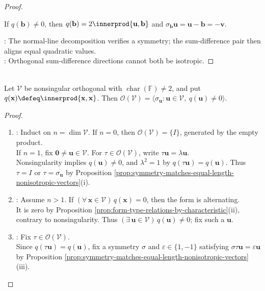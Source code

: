 \begin{proposition}
\begin{proof}
\begin{enumerate}[label=(\roman*)]
If $q(\mathbf{b})\neq0$, then $q(\mathbf{b})=2\innerprod{\mathbf{u},\mathbf{b}}$ and $\sigma_{\mathbf{b}}\mathbf{u}=\mathbf{u}-\mathbf{b}=-\mathbf{v}$.
\end{enumerate}
: The normal-line decomposition verifies a symmetry; the sum-difference pair then aligns equal quadratic values.\\
: Orthogonal sum-difference directions cannot both be isotropic.
\end{proof}
\end{proposition}

\begin{theorem} \label{thm:orthogonal-transformations-products-of-symmetries} \\
Let $\mathcal{V}$ be nonsingular orthogonal with $\operatorname{char}(\mathbb{F})\neq2$, and put $q(\mathbf{x})\defeq\innerprod{\mathbf{x},\mathbf{x}}$. Then $\mathcal{O}(\mathcal{V})=\langle\sigma_{\mathbf{u}}:\mathbf{u}\in\mathcal{V},\ q(\mathbf{u})\neq0\rangle$.
\begin{proof}
\begin{enumerate}[label=(\roman*)]
\setlength{\itemsep}{0pt}
\item {}: Induct on $n=\dim\mathcal{V}$. If $n=0$, then $\mathcal{O}(\mathcal{V})=\{I\}$, generated by the empty product.\\
If $n=1$, fix $\mathbf{0}\neq\mathbf{u}\in\mathcal{V}$. For $\tau\in\mathcal{O}(\mathcal{V})$, write $\tau\mathbf{u}=\lambda\mathbf{u}$.\\
Nonsingularity implies $q(\mathbf{u})\neq0$, and $\lambda^2=1$ by $q(\tau\mathbf{u})=q(\mathbf{u})$. Thus $\tau=I$ or $\tau=\sigma_{\mathbf{u}}$ by Proposition \ref{prop:symmetry-matches-equal-length-nonisotropic-vectors}(i).
\item {}: Assume $n>1$. If $(\forall\,\mathbf{x}\in\mathcal{V})\,q(\mathbf{x})=0$, then the form is alternating.\\
It is zero by Proposition \ref{prop:form-type-relations-by-characteristic}(ii), contrary to nonsingularity. Thus $(\exists\,\mathbf{u}\in\mathcal{V})\,q(\mathbf{u})\neq0$; fix such a $\mathbf{u}$.
\item {}: Fix $\tau\in\mathcal{O}(\mathcal{V})$.\\
Since $q(\tau\mathbf{u})=q(\mathbf{u})$, fix a symmetry $\sigma$ and $\varepsilon\in\{1,-1\}$ satisfying $\sigma\tau\mathbf{u}=\varepsilon\mathbf{u}$ by Proposition \ref{prop:symmetry-matches-equal-length-nonisotropic-vectors}(iii).\\

\end{enumerate}
\end{proof}
\end{theorem}
